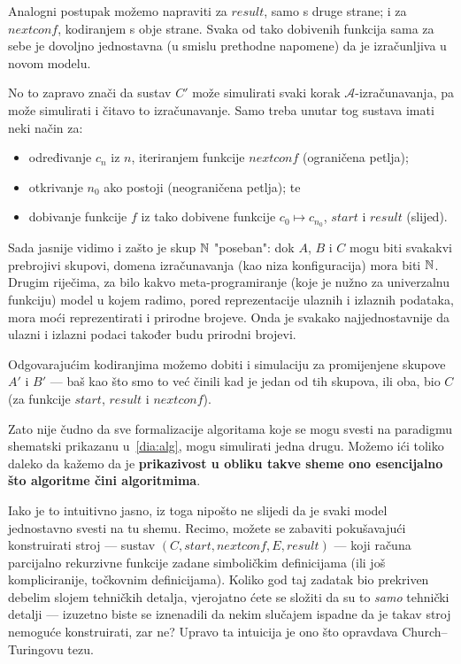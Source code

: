 Analogni postupak možemo napraviti za $result$, samo s druge strane; i za $nextconf$, kodiranjem s obje strane. Svaka od tako dobivenih funkcija sama za sebe je dovoljno jednostavna (u smislu prethodne napomene) da je iz\-ra\-čun\-lji\-va u novom modelu.

No to zapravo znači da sustav $C'$ može simulirati svaki korak $\mathcal A$-izračunavanja, pa može simulirati i čitavo to izračunavanje. Samo treba unutar tog sustava imati neki način za:
\begin{itemize}
    \item određivanje $c_n$ iz $n$, iteriranjem funkcije $nextconf$ (ograničena petlja);
    \item otkrivanje $n_0$ ako postoji (neograničena petlja); te
    \item dobivanje funkcije $f$ iz tako dobivene funkcije $c_0\mapsto c_{n_0}$, $start$ i $result$ (slijed).
\end{itemize}

Sada jasnije vidimo i zašto je skup ${\mathbb N}$ "poseban": dok $A$, $B$ i $C$ mogu biti svakakvi prebrojivi skupovi, domena izračunavanja (kao niza konfiguracija) mora biti ${\mathbb N}$. Drugim riječima, za bilo kakvo meta-programiranje (koje je nužno za univerzalnu funkciju) model u kojem radimo, pored reprezentacije ulaznih i izlaznih podataka, mora moći reprezentirati i prirodne brojeve. Onda je svakako najjednostavnije da ulazni i izlazni podaci također budu prirodni brojevi.

Odgovarajućim kodiranjima možemo dobiti i simulaciju za promijenjene skupove $A'$ i $B'$ --- baš kao što smo to već činili kad je jedan od tih skupova, ili oba, bio $C$ (za funkcije $start$, $result$ i $nextconf$).

Zato nije čudno da sve formalizacije algoritama koje se mogu svesti na paradigmu shematski prikazanu u~\eqref{dia:alg}, mogu simulirati jedna drugu. Možemo ići toliko daleko da kažemo da je \textbf{prikazivost u obliku takve sheme ono esencijalno što algoritme čini algoritmima}.

Iako je to intuitivno jasno, iz toga nipošto ne slijedi da je svaki model jednostavno svesti na tu shemu. Recimo, možete se zabaviti pokušavajući konstruirati stroj --- sustav $(C,start,nextconf,E,result)$ --- koji računa parcijalno rekurzivne funkcije zadane simboličkim definicijama (ili još kompliciranije, točkovnim definicijama). Koliko god taj zadatak bio prekriven debelim slojem tehničkih detalja, vjerojatno ćete se složiti da su to \emph{samo} tehnički detalji --- izuzetno biste se iznenadili da nekim slučajem ispadne da je takav stroj nemoguće konstruirati, zar ne? Upravo ta intuicija je ono što opravdava Church--\!Turingovu tezu.

